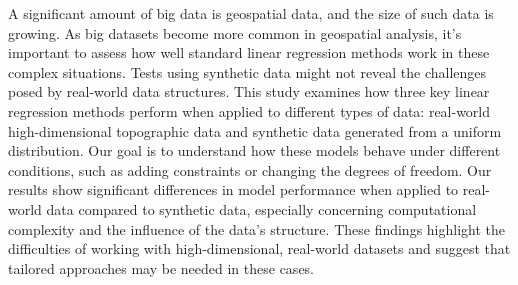  A significant amount of big data is geospatial data, and the size of such data is growing\cite{geospatital}. As big datasets become more common in geospatial analysis, it's important to assess how well standard linear regression methods work in these complex situations. Tests using synthetic data might not reveal the challenges posed by real-world data structures.  This study examines how three key linear regression methods perform when applied to different types of data: real-world high-dimensional topographic data and synthetic data generated from a uniform distribution. Our goal is to understand how these models behave under different conditions, such as adding constraints or changing the degrees of freedom. Our results show significant differences in model performance when applied to real-world data compared to synthetic data, especially concerning computational complexity and the influence of the data's structure. These findings highlight the difficulties of working with high-dimensional, real-world datasets and suggest that tailored approaches may be needed in these cases. \cite{openai2023chatgpt}